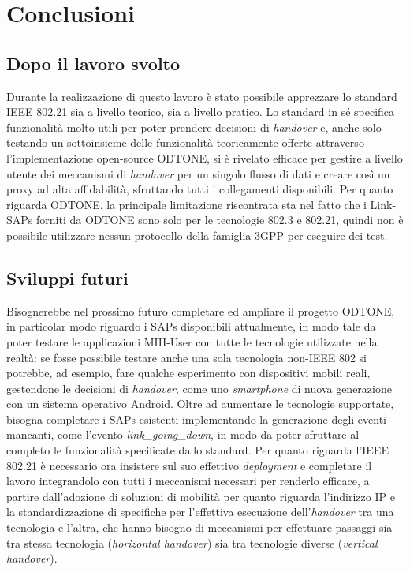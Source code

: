 \chapter{Conclusioni}

\section{Dopo il lavoro svolto}
Durante la realizzazione di questo lavoro è stato possibile apprezzare lo standard IEEE 802.21 sia a livello teorico, sia a livello pratico. Lo standard in sé specifica funzionalità molto utili per poter prendere decisioni di {\em handover} e, anche solo testando un sottoinsieme delle funzionalità teoricamente offerte attraverso l'implementazione open-source ODTONE, si è rivelato efficace per gestire a livello utente dei meccanismi di {\em handover} per un singolo flusso di dati e creare così un proxy ad alta affidabilità, sfruttando tutti i collegamenti disponibili. Per quanto riguarda ODTONE, la principale limitazione riscontrata sta nel fatto che i Link-SAPs forniti da ODTONE sono solo per le tecnologie 802.3 e 802.21, quindi non è possibile utilizzare nessun protocollo della famiglia 3GPP per eseguire dei test.

\section{Sviluppi futuri}
Bisognerebbe nel prossimo futuro completare ed ampliare il progetto ODTONE, in particolar modo riguardo i SAPs disponibili attualmente, in modo tale da poter testare le applicazioni MIH-User con tutte le tecnologie utilizzate nella realtà: se fosse possibile testare anche una sola tecnologia non-IEEE 802 si potrebbe, ad esempio, fare qualche esperimento con dispositivi mobili reali, gestendone le decisioni di {\em handover}, come uno {\em smartphone} di nuova generazione con un sistema operativo Android. Oltre ad aumentare le tecnologie supportate, bisogna completare i SAPs esistenti implementando la generazione degli eventi mancanti, come l'evento {\em link\_going\_down}, in modo da poter sfruttare al completo le funzionalità specificate dallo standard. Per quanto riguarda l'IEEE 802.21 è necessario ora insistere sul suo effettivo {\em deployment} e completare il lavoro integrandolo con tutti i meccanismi necessari per renderlo efficace, a partire dall'adozione di soluzioni di mobilità per quanto riguarda l'indirizzo IP e la standardizzazione di specifiche per l'effettiva esecuzione dell'{\em handover} tra una tecnologia e l'altra, che hanno bisogno di meccanismi per effettuare passaggi sia tra stessa tecnologia ({\em horizontal handover}) sia tra tecnologie diverse ({\em vertical handover}).